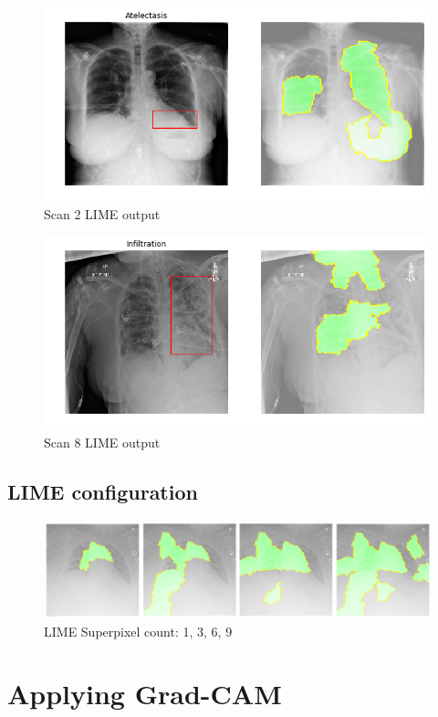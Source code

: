 \begin{figure}[h]
\centering
\caption{Scan 2 LIME output}
\includegraphics[width=12cm]{chapters/03_classification/images/lime_2.png}
\end{figure}

\begin{figure}[h]
\centering
\caption{Scan 8 LIME output}
\includegraphics[width=12cm]{chapters/03_classification/images/lime_8.png}
\end{figure}

\subsection{LIME configuration}

\begin{figure}[h]
\centering
\caption{LIME Superpixel count: 1, 3, 6, 9}
\includegraphics[width=14cm]{chapters/03_classification/images/lime-superpixel.png}
\end{figure}

\section{Applying Grad-CAM}

